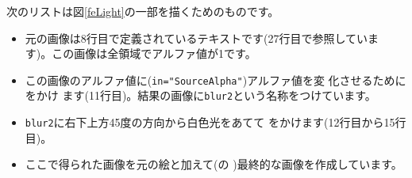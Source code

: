 次のリストは図\ref{feLight}の一部を描くためのものです。
\begin{itemize}
 \item 元の画像は8行目で定義されているテキストです(27行目で参照していま
       す)。この画像は全領域でアルファ値が1です。
 \item この画像のアルファ値に(\texttt{in="SourceAlpha"})アルファ値を変
       化させるために をかけ
       ます(11行目)。結果の画像に\texttt{blur2}という名称をつけています。
 \item \texttt{blur2}に右下上方45度の方向から白色光をあてて
       をかけます(12行目から15行目)。
 \item ここで得られた画像を元の絵と加えて(の
       )最終的な画像を作成しています。
\end{itemize}
\fi
